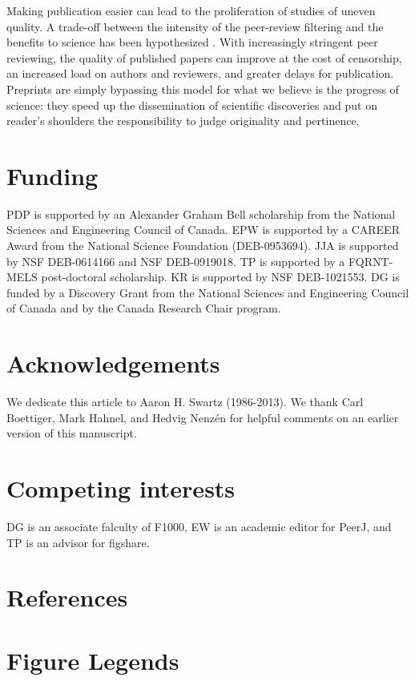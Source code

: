 \documentclass[10pt]{article}
\begin{document}
Making publication easier can lead to the proliferation of studies of uneven 
quality. A trade-off between the intensity of the peer-review filtering and 
the benefits to science has been hypothesized \cite{Aarssen2012}.  With 
increasingly stringent peer reviewing, the quality of published papers can 
improve at the cost of censorship, an increased load on authors and 
reviewers, and greater delays for publication.  Preprints are simply 
bypassing this model for what we believe is the progress of science: they 
speed up the dissemination of scientific discoveries and put on reader's 
shoulders the responsibility to judge originality and pertinence.

\section*{Funding}

PDP is supported by an Alexander Graham Bell scholarship from the National
Sciences and Engineering Council of Canada. EPW is supported by a CAREER Award
from the National Science Foundation (DEB-0953694). JJA is supported by NSF
DEB-0614166 and NSF DEB-0919018.  TP is supported by a FQRNT-MELS post-doctoral
scholarship. KR is supported by NSF DEB-1021553. DG is funded by a Discovery
Grant from the National Sciences and Engineering Council of Canada and by the
Canada Research Chair program.

\section*{Acknowledgements}

We dedicate this article to Aaron H. Swartz (1986-2013).  We thank Carl
Boettiger, Mark Hahnel, and Hedvig Nenz\'en for helpful comments on an earlier
version of this manuscript.

\section*{Competing interests}

DG is an associate falculty of F1000, EW is an academic editor for PeerJ, and TP
is an advisor for figshare.

\section*{References}


\newpage
\section*{Figure Legends}
\end{document}
